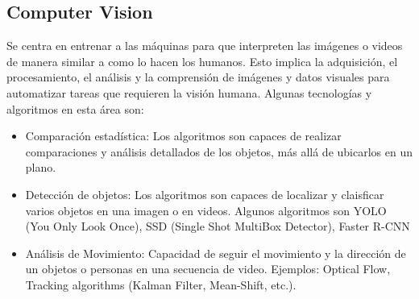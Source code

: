 \subsection{Computer Vision}
Se centra en entrenar a las máquinas para que interpreten las imágenes o videos de manera similar a como lo hacen los humanos. Esto implica la adquisición, el procesamiento, el análisis y la comprensión de imágenes y datos visuales para automatizar tareas que requieren la visión humana.
Algunas tecnologías y algoritmos en esta área son:
\newcommand{\CVone}{ Comparación estadística: Los algoritmos son capaces de  realizar comparaciones y análisis detallados de los objetos, más allá de ubicarlos en un plano.}

\newcommand{\CVtwo}{Detección de objetos: Los algoritmos son capaces de localizar y claisficar varios objetos en una imagen o en videos. Algunos algoritmos son YOLO (You Only Look Once), SSD (Single Shot MultiBox Detector), Faster R-CNN }

\newcommand{\CVthree}{ Análisis de Movimiento: Capacidad de seguir el movimiento y la dirección de un objetos o personas en una secuencia de video. Ejemplos: Optical Flow, Tracking algorithms (Kalman Filter, Mean-Shift, etc.). }

\begin{itemize}
	\item \CVone
	\item \CVtwo
	\item \CVthree
\end{itemize}
